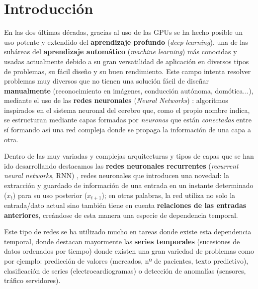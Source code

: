 %


\chapter{Introducción}\label{ch:introduccion}

En las dos últimas décadas, gracias al uso de las GPUs \cite{oh2004gpu} se ha hecho posible un uso potente y extendido del \textbf{aprendizaje profundo} (\textit{deep learning}), una de las subáreas del \textbf{aprendizaje automático} (\emph{machine learning}) más conocidas y usadas actualmente debido a su gran versatilidad de aplicación en diversos tipos de problemas, su fácil diseño y su buen rendimiento. Este campo intenta resolver problemas muy diversos que no tienen una solución fácil de diseñar \textbf{manualmente} (reconocimiento en imágenes, conducción autónoma, domótica...), mediante el uso de las \textbf{redes neuronales} (\emph{Neural Networks}) \cite{landahl1943statistical, hebb1949organization}: algoritmos inspirados en el sistema neuronal del cerebro que, como el propio nombre indica, se estructuran mediante capas formadas por \emph{neuronas} que están \emph{conectadas} entre sí formando así una red compleja donde se propaga la información de una capa a otra.

Dentro de las muy variadas y complejas arquitecturas y tipos de capas que se han ido desarrollando destacamos las \textbf{redes neuronales recurrentes} (\emph{recurrent neural networks}, RNN) \cite{hopfield1982neural, jordan1997serial}, redes neuronales que introducen una novedad: la extracción y guardado de información de una entrada en un instante determinado ($x_t$) para su uso posterior ($x_{t+1}$); en otras palabras, la red utiliza no solo la entrada/dato actual sino también tiene en cuenta \textbf{relaciones de las entradas anteriores}, creándose de esta manera una especie de dependencia temporal.

Este tipo de redes se ha utilizado mucho en tareas donde existe esta dependencia temporal, donde destacan mayormente las \textbf{series temporales} (sucesiones de datos ordenados por tiempo) \cite{wang2017origin} donde existen una gran variedad de problemas como por ejemplo: predicción de valores (mercados, nº de pacientes, texto predictivo), clasificación de series (electrocardiogramas) o detección de anomalías (sensores, tráfico servidores).

